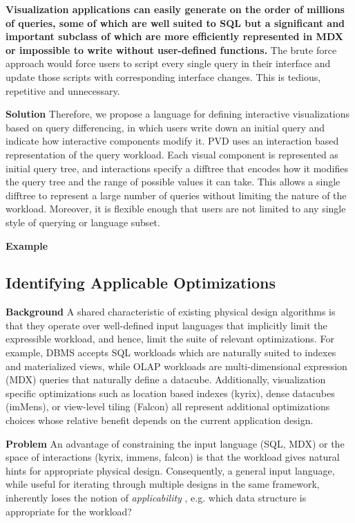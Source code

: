 \textbf{Visualization applications can easily generate on the order of millions of queries, some of which are well suited to SQL but a significant and important subclass of which are more efficiently represented in MDX or impossible to write without user-defined functions. }The brute force approach would force users to script every single query in their interface and update those scripts with corresponding interface changes. This is tedious, repetitive and unnecessary.

\textbf{Solution}
Therefore, we propose a language for defining interactive visualizations based on query differencing, in which users write down an initial query and indicate how interactive components modify it. PVD uses an interaction based representation of the query workload. Each visual component is represented as initial query tree, and interactions specify a difftree that encodes how it modifies the query tree and the range of possible values it can take. This allows a single difftree to represent a large number of queries without limiting the nature of the workload. Moreover, it is flexible enough that users are not limited to any single style of querying or language subset.

\textbf{Example}

\subsection{Identifying Applicable Optimizations}
\textbf{Background} A shared characteristic of existing physical design algorithms is that they operate over well-defined input languages that implicitly limit the expressible workload, and hence, limit the suite of relevant optimizations. For example, DBMS accepts SQL workloads which are naturally suited to indexes and materialized views, while OLAP workloads are multi-dimensional expression (MDX) queries that naturally define a datacube. Additionally, visualization specific optimizations such as location based indexes (kyrix), dense datacubes (imMens), or view-level tiling (Falcon) all represent additional optimizations choices whose relative benefit depends on the current application design.

\textbf{Problem} An advantage of constraining the input language (SQL, MDX) or the space of interactions (kyrix, immens, falcon) is that the workload gives natural hints for appropriate physical design. Consequently, a general input language, while useful for iterating through multiple designs in the same framework, inherently loses the notion of \textit{applicability} , e.g. which data structure is appropriate for the workload? 

